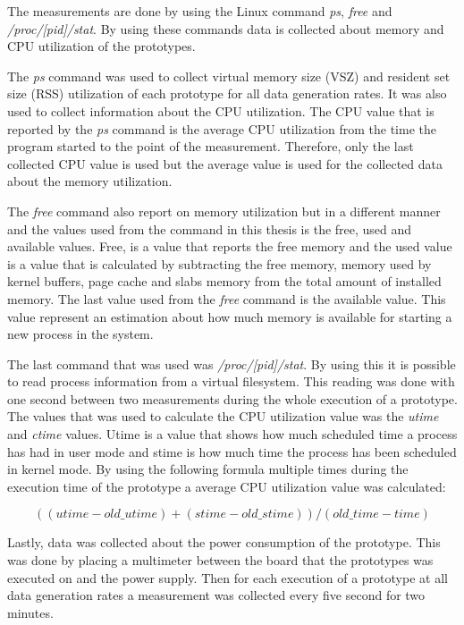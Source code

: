 The measurements are done by using the Linux command \textit{ps}, \textit{free} and \newline\textit{/proc/[pid]/stat}. By using these commands data is collected about memory and CPU utilization of the prototypes. 

The \textit{ps} command was used to collect virtual memory size (VSZ) and resident set size (RSS) utilization of each prototype for all data generation rates. It was also used to collect information about the CPU utilization. The CPU value that is reported by the \textit{ps} command is the average CPU utilization from the time the program started to the point of the measurement. Therefore, only the last collected CPU value is used but the average value is used for the collected data about the memory utilization.

The \textit{free} command also report on memory utilization but in a different manner and the values used from the command in this thesis is the free, used and available values. Free, is a value that reports the free memory and the used value is a value that is calculated by subtracting the free memory, memory used by kernel buffers, page cache and slabs memory from the total amount of installed memory. The last value used from the \textit{free} command is the available value. This value represent an estimation about how much memory is available for starting a new process in the system.   

The last command that was used was \textit{/proc/[pid]/stat}. By using this it is possible to read process information from a virtual filesystem. This reading was done with one second between two measurements during the whole execution of a prototype. The values that was used to calculate the CPU utilization value was the \textit{utime} and \textit{ctime} values. Utime is a value that shows how much scheduled time a process has had in user mode and stime is how much time the process has been scheduled in kernel mode. By using the following formula multiple times during the execution time of the prototype a average CPU utilization value was calculated:

\begin{equation*}
    ((utime - old\_utime) + (stime - old\_stime)) / (old\_time - time)
\end{equation*}

Lastly, data was collected about the power consumption of the prototype. This was done by placing a multimeter between the board that the prototypes was executed on and the power supply. Then for each execution of a prototype at all data generation rates a measurement was collected every five second for two minutes.  

